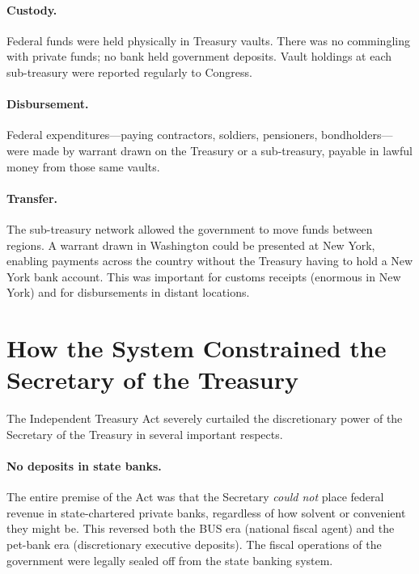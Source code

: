 \documentclass[12pt]{article}
\begin{document}
\paragraph{Custody.}
Federal funds were held physically in Treasury vaults.  There was no
commingling with private funds; no bank held government deposits.  Vault
holdings at each sub-treasury were reported regularly to Congress.

\paragraph{Disbursement.}
Federal expenditures---paying contractors, soldiers, pensioners,
bondholders---were made by warrant drawn on the Treasury or a
sub-treasury, payable in lawful money from those same vaults.

\paragraph{Transfer.}
The sub-treasury network allowed the government to move funds between
regions.  A warrant drawn in Washington could be presented at New York,
enabling payments across the country without the Treasury having to hold
a New York bank account.  This was important for customs receipts
(enormous in New York) and for disbursements in distant locations.

\section{How the System Constrained the Secretary of the Treasury}

The Independent Treasury Act severely curtailed the discretionary power
of the Secretary of the Treasury in several important respects.

\paragraph{No deposits in state banks.}
The entire premise of the Act was that the Secretary \emph{could not}
place federal revenue in state-chartered private banks, regardless of
how solvent or convenient they might be.  This reversed both the BUS era
(national fiscal agent) and the pet-bank era (discretionary executive
deposits).  The fiscal operations of the government were legally sealed
off from the state banking system.
\end{document}
